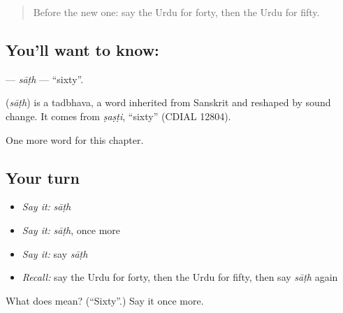 \begin{quote}
Before the new one: say the Urdu for forty, then the Urdu for fifty.
\end{quote}

\subsection*{You'll want to know: }
\textbf{} — \emph{sāṭh} — \textquotedblleft{}sixty\textquotedblright{}.

\begin{cousinweb}
\textbf{} (\emph{sāṭh}) is a tadbhava, a word inherited from Sanskrit and reshaped by sound change. It comes from \emph{ṣaṣṭi}, \textquotedblleft{}sixty\textquotedblright{} (CDIAL 12804).
\end{cousinweb}

\begin{grammarlens}[title={What you've built}]
One more word for this chapter.
\end{grammarlens}

\subsection*{Your turn}
\begin{itemize}
\raggedright
  \item \emph{Say it:} \emph{sāṭh}
  \item \emph{Say it:} \emph{sāṭh}, once more
  \item \emph{Say it:} say \emph{sāṭh}
  \item \emph{Recall:} say the Urdu for forty, then the Urdu for fifty, then say \emph{sāṭh} again
\end{itemize}

\begin{tcolorbox}[breakable,colback=teal!4,colframe=teal!35!black,title={Before you move on}]
What does  mean? (\textquotedblleft{}Sixty\textquotedblright{}.) Say it once more.
\end{tcolorbox}
